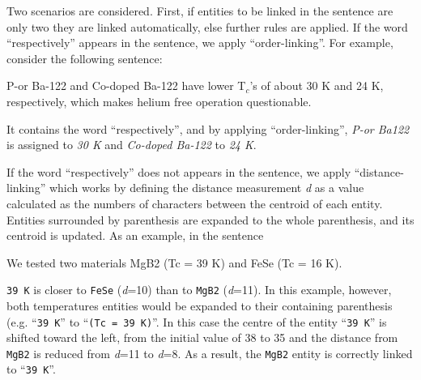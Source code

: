 \documentclass[]{interact}
\theoremstyle{plain}%
\theoremstyle{definition}
\theoremstyle{remark}
\newcommand{\tc}{T$_{c}$}
\begin{document}
Two scenarios are considered. First, if entities to be linked in the sentence are only two they are linked automatically, else further rules are applied. 
If the word ``respectively'' appears in the sentence, we apply ``order-linking''. 
For example, consider the following sentence:
\begin{displayquote}
    P-or Ba-122  and Co-doped Ba-122 have lower \tc's of about 30 K and 24 K, respectively, which makes helium free operation questionable.
\end{displayquote}
It contains the word ``respectively'', and by applying ``order-linking'', \textit{P-or Ba122} is assigned to \textit{30 K} and \textit{Co-doped Ba-122} to \textit{24 K}.


If the word ``respectively'' does not appears in the sentence, we apply ``distance-linking'' which works by defining the distance measurement \textit{d} as a value calculated as the numbers of characters between the centroid of each entity.
Entities surrounded by parenthesis are expanded to the whole parenthesis, and its centroid is updated.
As an example, in the sentence
\begin{displayquote}
    We tested two materials MgB2 (Tc = 39 K) and FeSe (Tc = 16 K).
\end{displayquote}

\texttt{39 K} is closer to \texttt{FeSe} (\textit{d}=10) than to \texttt{MgB2} (\textit{d}=11). 
In this example, however, both temperatures entities would be expanded to their containing parenthesis (e.g. ``\texttt{39 K}'' to ``\texttt{(Tc = 39 K)}''. 
In this case the centre of the entity ``\texttt{39 K}'' is shifted toward the left, from the initial value of 38 to 35 and the distance from \texttt{MgB2} is reduced from \textit{d}=11 to \textit{d}=8.
As a result, the \texttt{MgB2} entity is correctly linked to ``\texttt{39 K}''.
\end{document}
